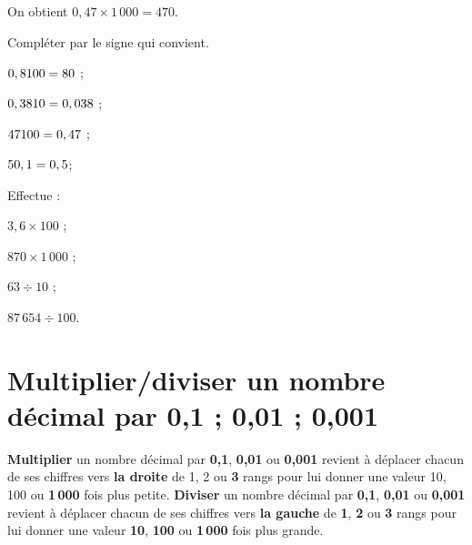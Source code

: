 \begin{methode*1}[]
\begin{exemple*1}
\begin{minipage}{.55\linewidth}
On obtient $0,47 \times 1\,000 = 470$. 
\end{minipage}
	\end{exemple*1}
	
\exercice

Compléter par le signe qui convient.
\begin{colenumerate}{4}
 \item $0,8 \dotfill 100=80$ ;
 \item $0,38 \dotfill 10=0,038$ ;
 \item $47 \dotfill 100=0,47$ ;
 \item $5 \dotfill 0,1=0,5$;
 \end{colenumerate}


\exercice

Effectue : 
\begin{colenumerate}{4}
 \item $3,6 \times 100$ ;
 \item $870 \times 1\,000$ ;
 \item $63 \div 10$ ;
 \item $87\,654 \div 100$.
 \end{colenumerate}
 
\end{methode*1}









\section{Multiplier/diviser un nombre décimal par 0,1 ; 0,01 ; 0,001}

\begin{aconnaitre}
\textbf{Multiplier} un nombre décimal par \textcolor{A1}{\textbf{0,1}}, \textcolor{B1}{\textbf{0,01}} ou \textcolor{J1}{\textbf{0,001}} revient à déplacer chacun de ses chiffres vers \textbf{la droite} de 1, 2 ou \textcolor{J1}{\textbf{3}} rangs pour lui donner une valeur 10, 100 ou \textcolor{J1}{\textbf{1\,000}} fois plus petite.
\textbf{Diviser} un nombre décimal par \textcolor{A1}{\textbf{0,1}}, \textcolor{B1}{\textbf{0,01}} ou \textcolor{J1}{\textbf{0,001}} revient à déplacer chacun de ses chiffres vers \textbf{la gauche} de \textcolor{A1}{\textbf{1}}, \textcolor{B1}{\textbf{2}} ou \textcolor{J1}{\textbf{3}} rangs pour lui donner une valeur \textcolor{A1}{\textbf{10}}, \textcolor{B1}{\textbf{100}} ou \textcolor{J1}{\textbf{1\,000}} fois plus grande.
\end{aconnaitre}



